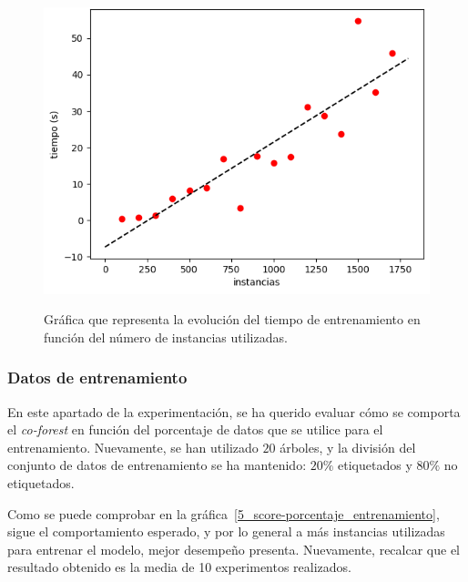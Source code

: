 \begin{figure}[h]
	\caption{Gráfica que representa la evolución del tiempo de entrenamiento en función del número de instancias utilizadas.}
	\centering
	\includegraphics[width=\textwidth]{../img/memoria/5_coforest_tiempo-instancias}
	\label{5_coforest_tiempo-instancias}
\end{figure}


\subsubsection{Datos de entrenamiento}

En este apartado de la experimentación, se ha querido evaluar cómo se comporta el \textit{co-forest} en función del porcentaje de datos que se utilice para el entrenamiento. Nuevamente, se han utilizado  $20$ árboles, y la división del conjunto de datos de entrenamiento se ha mantenido: $20\%$ etiquetados y $80\%$ no etiquetados.

Como se puede comprobar en la gráfica~\ref{5_score-porcentaje_entrenamiento}, sigue el comportamiento esperado, y por lo general a más instancias utilizadas para entrenar el modelo, mejor desempeño presenta. Nuevamente, recalcar que el resultado obtenido es la media de 10 experimentos realizados.

